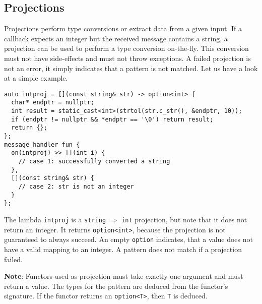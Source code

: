 \subsection{Projections}

Projections perform type conversions or extract data from a given input.
If a callback expects an integer but the received message contains a string, a projection can be used to perform a type conversion on-the-fly.
This conversion must not have side-effects and must not throw exceptions.
A failed projection is not an error, it simply indicates that a pattern is not matched.
Let us have a look at a simple example.

\begin{lstlisting}
auto intproj = [](const string& str) -> option<int> {
  char* endptr = nullptr;
  int result = static_cast<int>(strtol(str.c_str(), &endptr, 10));
  if (endptr != nullptr && *endptr == '\0') return result;
  return {};
};
message_handler fun {
  on(intproj) >> [](int i) {
    // case 1: successfully converted a string
  },
  [](const string& str) {
    // case 2: str is not an integer
  }
};
\end{lstlisting}

The lambda \lstinline^intproj^ is a \lstinline^string^ $\Rightarrow$ \lstinline^int^ projection, but note that it does not return an integer.
It returns \lstinline^option<int>^, because the projection is not guaranteed to always succeed.
An empty \lstinline^option^ indicates, that a value does not have a valid mapping to an integer.
A pattern does not match if a projection failed.

\textbf{Note}: Functors used as projection must take exactly one argument and must return a value.
The types for the pattern are deduced from the functor's signature.
If the functor returns an \lstinline^option<T>^, then \lstinline^T^ is deduced.
